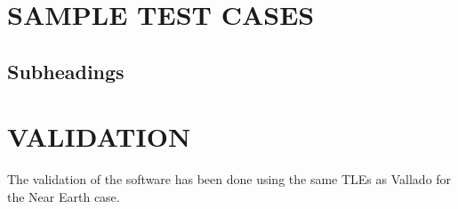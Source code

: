 \documentclass{article}
\begin{document}



\section{SAMPLE TEST CASES}
\label{sec:sampletestcases}


\subsection{Subheadings}
\label{ssec:subhead}



\section{VALIDATION}
\label{sec:validation}

The validation of the software has been done using the same TLEs as Vallado for the Near Earth case.
\end{document}
